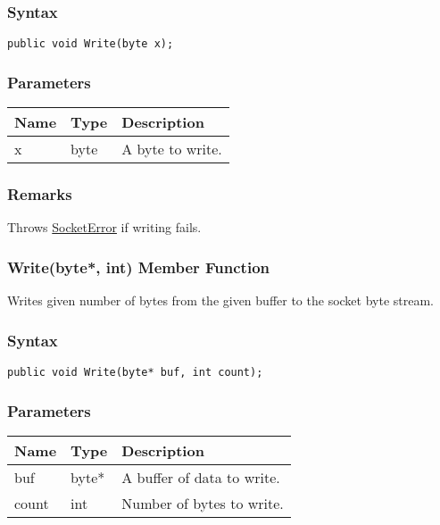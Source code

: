 \documentclass[a4paper,oneside,11.000000pt]{book}
\begin{document}
\subsubsection*{Syntax}\texttt{public void Write(byte x);}
\subsubsection*{Parameters}
\begin{flushleft}
\begin{supertabular}[l]{lll}
\textbf{Name}
& \textbf{Type}
& \textbf{Description}
\\
\hline
x
& byte
& A byte to write.

\\
\end{supertabular}

\end{flushleft}
\subsubsection*{Remarks}
\begin{flushleft}
Throws \hyperlink{System.Net.Sockets.SocketError}{SocketError} if writing fails.

\end{flushleft}
\clearpage

\hypertarget{System.Net.Sockets.SocketByteStream.Write.P.System.Net.Sockets.SocketByteStream.P.byte.int}{\subsubsection*{Write(byte*, int) Member Function}}
\begin{flushleft}
Writes given number of bytes from the given buffer to the socket byte stream.

\end{flushleft}
\subsubsection*{Syntax}\texttt{public void Write(byte* buf, int count);}

\subsubsection*{Parameters}
\begin{flushleft}
\begin{supertabular}[l]{lll}
\textbf{Name}
& \textbf{Type}
& \textbf{Description}
\\
\hline
buf
& byte*
& A buffer of data to write.

\\
count
& int
& Number of bytes to write.

\\
\end{supertabular}

\end{flushleft}
\end{document}
